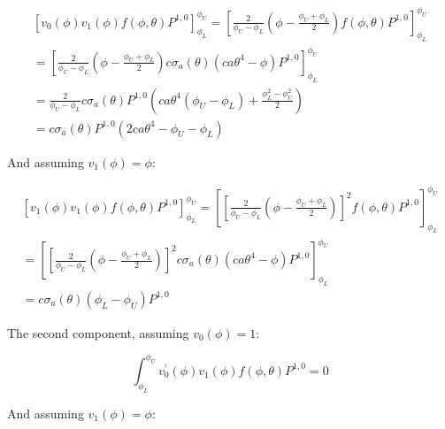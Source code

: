 \documentclass[12pt,a4paper,pagesize=pdftex]{scrartcl}
\begin{document}
\begin{multline*}
    \left[v_0\left(\phi\right) v_1\left(\phi\right) f\left(\phi, \theta\right) P^{1,0}\right]_{\phi_L}^{\phi_U} = \left[\frac{2}{\phi_U - \phi_L}\left(\phi - \frac{\phi_U + \phi_L}{2}\right) f\left(\phi, \theta\right) P^{1,0}\right]_{\phi_L}^{\phi_U} \\
    = \left[\frac{2}{\phi_U - \phi_L}\left(\phi - \frac{\phi_U + \phi_L}{2}\right) c \sigma_a\left(\theta\right) \left(c a \theta^4 - \phi\right) P^{1,0}\right]_{\phi_L}^{\phi_U} \\
    = \frac{2}{\phi_U - \phi_L} c \sigma_a\left(\theta\right) P^{1,0} \left(c a \theta^4 \left(\phi_U - \phi_L\right) + \frac{\phi_L^2 - \phi_U^2}{2}\right) \\
    = c \sigma_a\left(\theta\right) P^{1,0} \left(2 c a \theta^4 - \phi_U - \phi_L\right)
\end{multline*}

And assuming \(v_1\left(\phi\right) = \phi\):

\begin{multline*}
    \left[v_1\left(\phi\right) v_1\left(\phi\right) f\left(\phi, \theta\right) P^{1,0}\right]_{\phi_L}^{\phi_U} = \left[\left[\frac{2}{\phi_U - \phi_L}\left(\phi - \frac{\phi_U + \phi_L}{2}\right)\right]^2 f\left(\phi, \theta\right) P^{1,0}\right]_{\phi_L}^{\phi_U} \\
    = \left[\left[\frac{2}{\phi_U - \phi_L}\left(\phi - \frac{\phi_U + \phi_L}{2}\right)\right]^2 c \sigma_a\left(\theta\right) \left(c a \theta^4 - \phi\right) P^{1,0}\right]_{\phi_L}^{\phi_U} \\
    = c \sigma_a\left(\theta\right) \left(\phi_L - \phi_U\right) P^{1,0}
\end{multline*}

The second component, assuming \(v_0\left(\phi\right) = 1\):

\begin{equation*}
    \int_{\phi_L}^{\phi_U} v_0^\prime\left(\phi\right) v_1\left(\phi\right) f\left(\phi, \theta\right) P^{1,0} = 0
\end{equation*}

And assuming \(v_1\left(\phi\right) = \phi\):
\end{document}
